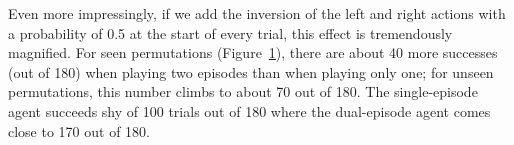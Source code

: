 Even more impressingly, if we add the inversion of the left and right actions
with a probability of 0.5 at the start of every trial, this effect is
tremendously magnified. For seen permutations
(Figure~\ref{fig:20permsLR_distrib}), there are about 40 more successes (out of
180) when playing two episodes than when playing only one; for unseen
permutations, this number climbs to about 70 out of 180. The single-episode
agent succeeds shy of 100 trials out of 180 where the dual-episode agent
comes close to 170 out of 180.\\

\begin{figure}
	\centering
	\caption{}
	\label{fig:20permsLR_distrib}
\end{figure}

